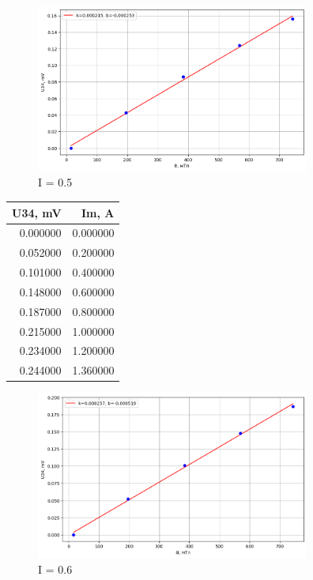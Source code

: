 \documentclass[a4paper, 12pt]{article}
\begin{document}
        \begin{figure}[h!]
            \centering
            \includegraphics[width=90mm]{./images/image copy 2.png}
            \caption{I = 0.5}
        \end{figure}
        \begin{table}[h!]
            \centering
            \begin{tabular}{rr}
                \toprule
                U34, mV & Im, A \\
                \midrule
                0.000000 & 0.000000 \\
                0.052000 & 0.200000 \\
                0.101000 & 0.400000 \\
                0.148000 & 0.600000 \\
                0.187000 & 0.800000 \\
                0.215000 & 1.000000 \\
                0.234000 & 1.200000 \\
                0.244000 & 1.360000 \\
                \bottomrule
                \end{tabular}
            \end{table}
            \newpage
                \begin{figure}[h!]
                    \centering
                    \includegraphics[width=90mm]{./images/image copy 3.png}
                    \caption{I = 0.6}
                \end{figure}
\end{document}
